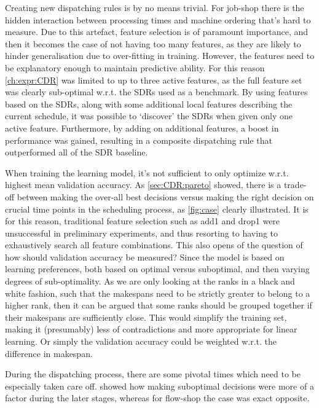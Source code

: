 \documentclass[smallextended]{svjour3}
\begin{document}
Creating new dispatching rules is by no means trivial. For job-shop there is 
the hidden interaction between processing times and machine ordering that's 
hard to measure.
Due to this artefact, feature selection is of paramount importance, and then it 
becomes the case of not having too many features, as they are likely to hinder 
generalisation due to over-fitting in training. However, the features need to 
be explanatory enough to maintain predictive ability. 
For this reason \cref{ch:expr:CDR} was limited to up to three active features, 
as the full feature set was clearly sub-optimal w.r.t. the SDRs used as a 
benchmark. 
By using features based on the SDRs, along with some additional local features 
describing the current schedule, it was possible to `discover' the SDRs when 
given only one active feature. %
Furthermore, by adding on additional features, a boost in performance was 
gained, resulting in a composite dispatching rule that outperformed all of the 
SDR baseline. 

When training the learning model, it's not sufficient to only optimize w.r.t. 
highest mean validation accuracy. As \cref{sec:CDR:pareto} showed, there is a 
trade-off between making the over-all best decisions versus making the right 
decision on crucial time points in the scheduling process, as \cref{fig:case} 
clearly illustrated. It is for this reason, traditional feature selection such 
as add1 and drop1 were unsuccessful in preliminary experiments, and thus 
resorting to having to exhaustively search all feature combinations.
This also opens of the question of how should validation accuracy be measured? 
Since the model is based on learning preferences, both based on optimal versus 
suboptimal, and then varying degrees of sub-optimality. As we are only looking 
at the ranks in a black and white fashion, such that the makespans need to be 
strictly greater to belong to a higher rank, then it can be argued that some 
ranks should be grouped together if their makespans are sufficiently close. 
This would simplify the training set, making it (presumably) less of 
contradictions and more appropriate for linear learning. Or simply the 
validation accuracy could be weighted w.r.t. the  difference in 
makespan.

During the dispatching process, there are some pivotal times which need to be 
especially taken care off.  showed how making suboptimal 
decisions were more of a factor during the later stages, whereas for flow-shop 
the case was exact opposite. 
\end{document}
